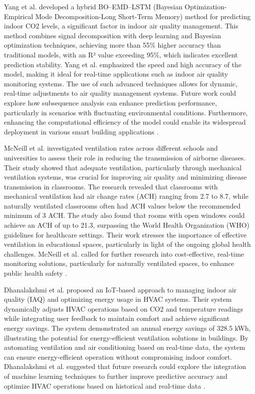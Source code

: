 Yang et al. developed a hybrid BO–EMD–LSTM (Bayesian Optimization-Empirical Mode Decomposition-Long Short-Term Memory) method for predicting indoor CO2 levels, a significant factor in indoor air quality management. This method combines signal decomposition with deep learning and Bayesian optimization techniques, achieving more than 55\% higher accuracy than traditional models, with an R² value exceeding 95\%, which indicates excellent prediction stability. Yang et al. emphasized the speed and high accuracy of the model, making it ideal for real-time applications such as indoor air quality monitoring systems. The use of such advanced techniques allows for dynamic, real-time adjustments to air quality management systems. Future work could explore how subsequence analysis can enhance prediction performance, particularly in scenarios with fluctuating environmental conditions. Furthermore, enhancing the computational efficiency of the model could enable its widespread deployment in various smart building applications \cite{6}.

McNeill et al. investigated ventilation rates across different schools and universities to assess their role in reducing the transmission of airborne diseases. Their study showed that adequate ventilation, particularly through mechanical ventilation systems, was crucial for improving air quality and minimizing disease transmission in classrooms. The research revealed that classrooms with mechanical ventilation had air change rates (ACH) ranging from 2.7 to 8.7, while naturally ventilated classrooms often had ACH values below the recommended minimum of 3 ACH. The study also found that rooms with open windows could achieve an ACH of up to 21.3, surpassing the World Health Organization (WHO) guidelines for healthcare settings. Their work stresses the importance of effective ventilation in educational spaces, particularly in light of the ongoing global health challenges. McNeill et al. called for further research into cost-effective, real-time monitoring solutions, particularly for naturally ventilated spaces, to enhance public health safety \cite{7}.

Dhanalakshmi et al. proposed an IoT-based approach to managing indoor air quality (IAQ) and optimizing energy usage in HVAC systems. Their system dynamically adjusts HVAC operations based on CO2 and temperature readings while integrating user feedback to maintain comfort and achieve significant energy savings. The system demonstrated an annual energy savings of 328.5 kWh, illustrating the potential for energy-efficient ventilation solutions in buildings. By automating ventilation and air conditioning based on real-time data, the system can ensure energy-efficient operation without compromising indoor comfort. Dhanalakshmi et al. suggested that future research could explore the integration of machine learning techniques to further improve predictive accuracy and optimize HVAC operations based on historical and real-time data \cite{8}.

